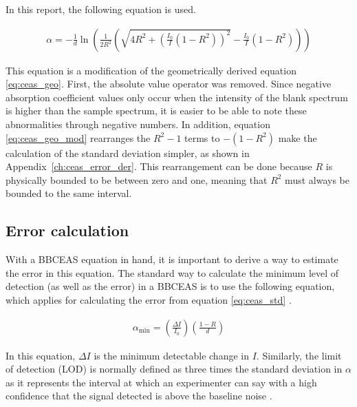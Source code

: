 In this report, the following equation is used.


\begin{align}
    \alpha = -\frac{1}{d}\ln\left(\frac{1}{2R^2}\left(\sqrt{4R^2+\left(\frac{I_0}{I}(1-R^2)\right)^2} - \frac{I_0}{I}(1-R^2)\right)\right) \label{eq:ceas_geo_mod}
\end{align}

This equation is a modification of the geometrically derived equation
\eqref{eq:ceas_geo}. First, the absolute value operator was removed. Since
negative absorption coefficient values only occur when the intensity of
the blank spectrum is higher than the sample spectrum, it is easier to be
able to note these abnormalities through negative numbers. In addition,
equation \eqref{eq:ceas_geo_mod} rearranges the $R^2-1$ terms to $-(1-R^2)$
make the calculation of the standard deviation simpler, as shown in
Appendix~\ref{ch:ceas_error_der}. This rearrangement can be done because $R$
is physically bounded to be between zero and one, meaning that $R^2$ must
always be bounded to the same interval.



\subsection{Error calculation}\label{subsec:ceas_error}


With a \ac{BBCEAS} equation in hand, it is important to derive a way to
estimate the error in this equation. The standard way to calculate the minimum
level of detection (as well as the error) in a \ac{BBCEAS} is to use the
following equation, which applies for calculating the error from equation
\eqref{eq:ceas_std} \cite{Mazurenka:2005fh}.

\begin{align}
  \alpha_{\text{min}} = \left(\frac{\Delta
  I}{I_0}\right)\left(\frac{1-R}{d}\right)\label{eq:ceas_min}
\end{align}

In this equation, $\Delta I$ is the minimum detectable change in $I$.
Similarly, the limit of detection (LOD) is normally defined as three times
the standard deviation in $\alpha$ as it represents the interval at which an
experimenter can say with a high confidence that the signal detected is above
the baseline noise \cite{Islam:2007ea}.

